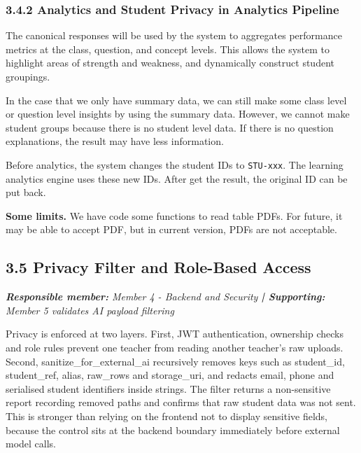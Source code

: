 \documentclass[11pt,a4paper]{article}
\begin{document}
\subsubsection*{3.4.2 Analytics and Student Privacy in Analytics Pipeline}


The canonical responses will be used by the system to aggregates performance metrics at the class, question, and concept levels. This allows the system to highlight areas of strength and weakness, and dynamically construct student groupings.\par

In the case that we only have summary data, we can still make some class level or question level insights by using the summary data. However, we cannot make student groups because there is no student level data. If there is no question explanations, the result may have less information.\par

Before analytics, the system changes the student IDs to \texttt{STU-xxx}. The learning analytics engine uses these new IDs. After get the result, the original ID can be put back.\par

\textbf{Some limits.} We have code some functions to read table PDFs. For future, it may be able to accept PDF, but in current version, PDFs are not acceptable.\par

\subsection*{3.5 Privacy Filter and Role-Based Access}


\noindent\textit{\textbf{Responsible member: }Member 4 - Backend and Security\textbf{ | Supporting: }Member 5 validates AI payload filtering}\par

Privacy is enforced at two layers. First, JWT authentication, ownership checks and role rules prevent one teacher from reading another teacher's raw uploads. Second, sanitize\_for\_external\_ai recursively removes keys such as student\_id, student\_ref, alias, raw\_rows and storage\_uri, and redacts email, phone and serialised student identifiers inside strings. The filter returns a non-sensitive report recording removed paths and confirms that raw student data was not sent. This is stronger than relying on the frontend not to display sensitive fields, because the control sits at the backend boundary immediately before external model calls.\par
\end{document}
